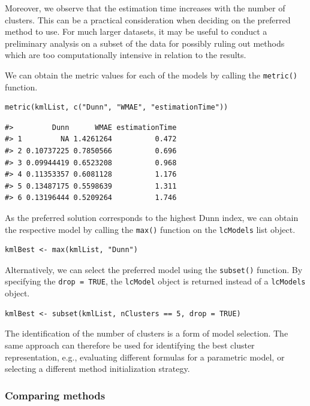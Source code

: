 Moreover, we observe that the estimation time increases with the number of clusters. This can be a practical consideration when deciding on the preferred method to use. For much larger datasets, it may be useful to conduct a preliminary analysis on a subset of the data for possibly ruling out methods which are too computationally intensive in relation to the results.

We can obtain the metric values for each of the models by calling the \texttt{metric()} function.

\begin{verbatim}
metric(kmlList, c("Dunn", "WMAE", "estimationTime"))
\end{verbatim}

\begin{verbatim}
#>         Dunn      WMAE estimationTime
#> 1         NA 1.4261264          0.472
#> 2 0.10737225 0.7850566          0.696
#> 3 0.09944419 0.6523208          0.968
#> 4 0.11353357 0.6081128          1.176
#> 5 0.13487175 0.5598639          1.311
#> 6 0.13196444 0.5209264          1.746
\end{verbatim}

As the preferred solution corresponds to the highest Dunn index, we can obtain the respective model by calling the \texttt{max()} function on the \texttt{lcModels} list object.

\begin{verbatim}
kmlBest <- max(kmlList, "Dunn")
\end{verbatim}

Alternatively, we can select the preferred model using the \texttt{subset()} function. By specifying the \texttt{drop\ =\ TRUE}, the \texttt{lcModel} object is returned instead of a \texttt{lcModels} object.

\begin{verbatim}
kmlBest <- subset(kmlList, nClusters == 5, drop = TRUE)
\end{verbatim}

The identification of the number of clusters is a form of model selection. The same approach can therefore be used for identifying the best cluster representation, e.g., evaluating different formulas for a parametric model, or selecting a different method initialization strategy.

\subsubsection{Comparing methods}\label{comparing-methods}

